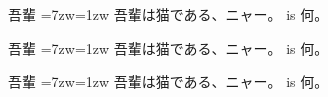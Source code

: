 ﻿\documentclass{article}
\begin{document}
吾輩%
\DirBoxTate\vbox{\sloppy\hsize=7zw\parindent=1zw
吾輩は猫である、ニャー。}
is 何。

吾輩%
\DirBoxRotR\vbox{\sloppy\hsize=7zw\parindent=1zw
吾輩は猫である、ニャー。}
is 何。

吾輩%
\DirBoxRotL\vbox{\sloppy\hsize=7zw\parindent=1zw
吾輩は猫である、ニャー。}
is 何。
\end{document}
